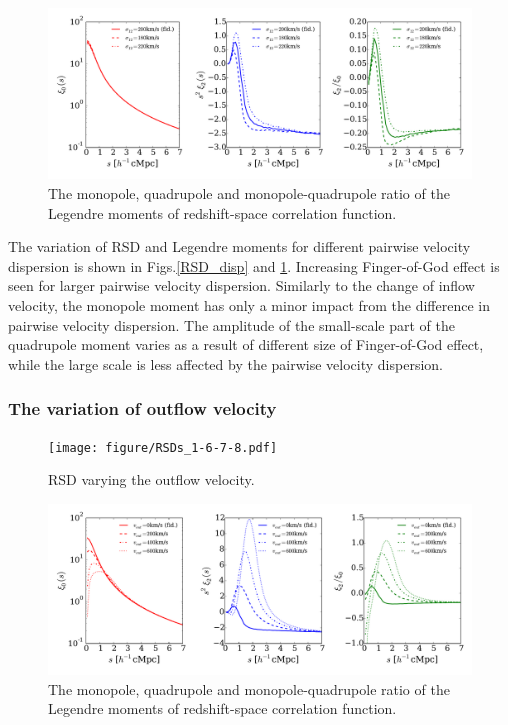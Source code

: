 \documentclass[useAMS,usenatbib,twocolumn]{mn2e}
\begin{document}
\begin{figure}
 \begin{center}
  \includegraphics[angle=0,width=\textwidth]{figure/RSD_moment_model1-9-10.pdf}
  \caption{The monopole, quadrupole and monopole-quadrupole ratio of the Legendre
    moments of redshift-space correlation function.}\label{moment_disp}
 \end{center}
\end{figure}

The variation of RSD and Legendre moments for different pairwise velocity
dispersion is shown in Figs.\ref{RSD_disp} and \ref{moment_disp}. 
Increasing Finger-of-God effect is seen for larger pairwise velocity
dispersion. Similarly to the change of inflow velocity, the monopole moment
has only a minor impact from the difference in pairwise velocity dispersion.
The amplitude of the small-scale part of the quadrupole moment varies
as a result of different size of Finger-of-God effect, while the large
scale is less affected by the pairwise velocity dispersion.


\subsubsection{The variation of outflow velocity}

\begin{figure}
 \begin{center}
  \texttt{[image: figure/RSDs\_1-6-7-8.pdf]}
  \caption{RSD varying the outflow velocity.}\label{RSD_outflow}
 \end{center}
\end{figure}

\begin{figure}
 \begin{center}
  \includegraphics[angle=0,width=\textwidth]{figure/RSD_moment_model1-6-7-8.pdf}
  \caption{The monopole, quadrupole and monopole-quadrupole ratio of the Legendre
    moments of redshift-space correlation function.}\label{moment_outflow}
 \end{center}
\end{figure}
\end{document}

